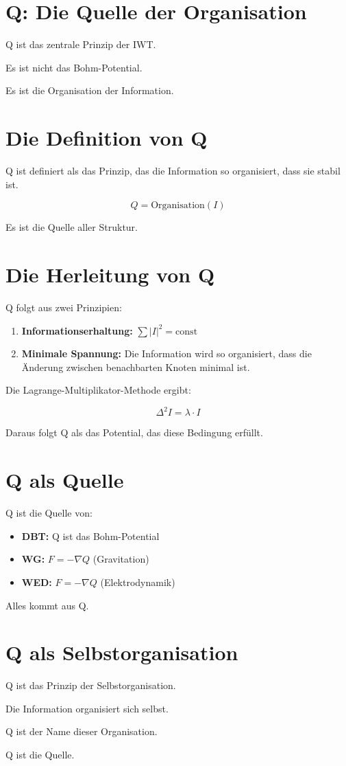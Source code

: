
\section{Q: Die Quelle der Organisation}

Q ist das zentrale Prinzip der IWT.

Es ist nicht das Bohm-Potential.

Es ist die Organisation der Information.

\section{Die Definition von Q}

Q ist definiert als das Prinzip, das die Information so organisiert, dass sie stabil ist.

\[
Q = \text{Organisation}(I)
\]

Es ist die Quelle aller Struktur.

\section{Die Herleitung von Q}

Q folgt aus zwei Prinzipien:

\begin{enumerate}
    \item \textbf{Informationserhaltung:} \( \sum |I|^2 = \text{const} \)
    \item \textbf{Minimale Spannung:} Die Information wird so organisiert, dass die Änderung zwischen benachbarten Knoten minimal ist.
\end{enumerate}

Die Lagrange-Multiplikator-Methode ergibt:

\[
\Delta^2 I = \lambda \cdot I
\]

Daraus folgt Q als das Potential, das diese Bedingung erfüllt.

\section{Q als Quelle}

Q ist die Quelle von:

\begin{itemize}
    \item \textbf{DBT:} Q ist das Bohm-Potential
    \item \textbf{WG:} \( F = -\nabla Q \) (Gravitation)
    \item \textbf{WED:} \( F = -\nabla Q \) (Elektrodynamik)
\end{itemize}

Alles kommt aus Q.

\section{Q als Selbstorganisation}

Q ist das Prinzip der Selbstorganisation.

Die Information organisiert sich selbst.

Q ist der Name dieser Organisation.

Q ist die Quelle.
